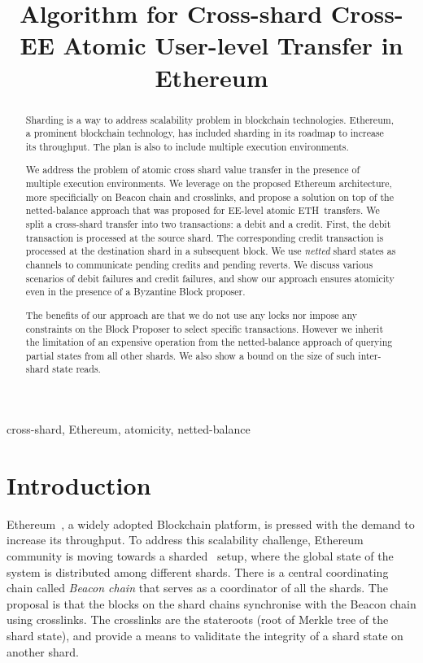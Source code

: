 \documentclass{IEEEtran}
\title{Algorithm for Cross-shard Cross-EE Atomic User-level \eth Transfer in Ethereum}
\author{\IEEEauthorblockN{Raghavendra Ramesh}
\IEEEauthorblockA{\textit{Consensys Software R \& D} \\
Brisbane, Australia \\
raghavendra.ramesh@consensys.net}}
\newcommand{\eth}[0]{ETH~}
\begin{document}
\maketitle

\begin{abstract}
Sharding is a way to address scalability problem in blockchain technologies. Ethereum, a prominent blockchain technology, has included sharding in its roadmap to increase its throughput. The plan is also to include multiple execution environments. 

We address the problem of atomic cross shard value transfer in the presence of multiple execution environments. We leverage on the proposed Ethereum architecture, more specificially on Beacon chain and crosslinks, and propose a solution on top of the netted-balance approach that was proposed for EE-level atomic \eth transfers. We split a cross-shard transfer into two transactions: a debit and a credit. First, the debit transaction is processed at the source shard. The corresponding credit transaction is processed at the destination shard in a subsequent block. We use {\em netted} shard states as channels to communicate pending credits and pending reverts. We discuss various scenarios of debit failures and credit failures, and show our approach ensures atomicity even in the presence of a Byzantine Block proposer. 

The benefits of our approach are that we do not use any locks nor impose any constraints on the Block Proposer to select specific transactions. However we inherit the limitation of an expensive operation from the netted-balance approach of querying partial states from all other shards. We also show a bound on the size of such inter-shard state reads.
\end{abstract}

\begin{IEEEkeywords}
cross-shard, Ethereum, atomicity, netted-balance
\end{IEEEkeywords}

\section{Introduction}

Ethereum~\cite{eth}, a widely adopted Blockchain platform, is pressed with the demand to increase its throughput. To address this scalability challenge, Ethereum community is moving towards a sharded~\cite{sharding} setup, where the global state of the system is distributed among different shards. There is a central coordinating chain called {\em Beacon chain} that serves as a coordinator of all the shards. The proposal is that the blocks on the shard chains synchronise with the Beacon chain using crosslinks. The crosslinks are the stateroots (root of Merkle tree of the shard state), and provide a means to validitate the integrity of a shard state on another shard. 
\end{document}
